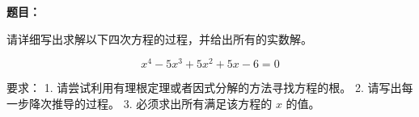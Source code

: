 \textbf{题目：}

请详细写出求解以下四次方程的过程，并给出所有的实数解。

$$ x^4 - 5x^3 + 5x^2 + 5x - 6 = 0 $$

要求：
1. 请尝试利用有理根定理或者因式分解的方法寻找方程的根。
2. 请写出每一步降次推导的过程。
3. 必须求出所有满足该方程的 $x$ 的值。
